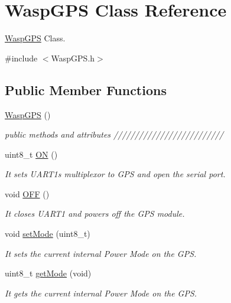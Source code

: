 \hypertarget{class_wasp_g_p_s}{}\section{Wasp\+G\+PS Class Reference}
\label{class_wasp_g_p_s}


\hyperlink{class_wasp_g_p_s}{Wasp\+G\+PS} Class.  




{\ttfamily \#include $<$Wasp\+G\+P\+S.\+h$>$}

\subsection*{Public Member Functions}
\begin{DoxyCompactItemize}
\item 
\hyperlink{class_wasp_g_p_s_ae4c985d18fdd5d579ed826091370dd5f}{Wasp\+G\+PS} ()
\begin{DoxyCompactList}\small\item\em public methods and attributes ////////////////////////// \end{DoxyCompactList}\item 
uint8\+\_\+t \hyperlink{class_wasp_g_p_s_aee96d01b9cb4c202aee0f1eb7d23f07d}{ON} ()
\begin{DoxyCompactList}\small\item\em It sets U\+A\+R\+T1\textquotesingle{}s multiplexor to G\+PS and open the serial port. \end{DoxyCompactList}\item 
void \hyperlink{class_wasp_g_p_s_a7ca48db0ad28499ec707da9c8d4c168c}{O\+FF} ()
\begin{DoxyCompactList}\small\item\em It closes U\+A\+R\+T1 and powers off the G\+PS module. \end{DoxyCompactList}\item 
void \hyperlink{class_wasp_g_p_s_ad1fb46ced4ab1e70acdc6b8b65c22017}{set\+Mode} (uint8\+\_\+t)
\begin{DoxyCompactList}\small\item\em It sets the current internal Power Mode on the G\+PS. \end{DoxyCompactList}\item 
uint8\+\_\+t \hyperlink{class_wasp_g_p_s_ac7f5eb6748d3fb0504223db1734de4f6}{get\+Mode} (void)
\begin{DoxyCompactList}\small\item\em It gets the current internal Power Mode on the G\+PS. \end{DoxyCompactList}\item 

\end{DoxyCompactItemize}
